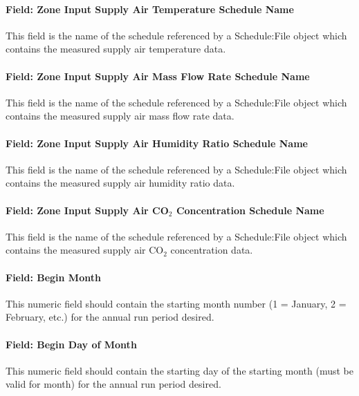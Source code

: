 \documentclass[11pt]{article}
\begin{document}
\paragraph{Field: Zone Input Supply Air Temperature Schedule Name}\label{field-zone-input-supply-air-temperature-schedule-name-hm}
This field is the name of the schedule referenced by a Schedule:File object which contains the measured supply air temperature data.

\paragraph{Field: Zone Input Supply Air Mass Flow Rate Schedule Name}\label{field-zone-input-supply-air-mass-flow-rate-schedule-name-hm}
This field is the name of the schedule referenced by a Schedule:File object which contains the measured supply air mass flow rate data.

\paragraph{Field: Zone Input Supply Air Humidity Ratio Schedule Name}\label{field-zone-input-supply-air-humidity-ratio-schedule-name-hm}
This field is the name of the schedule referenced by a Schedule:File object which contains the measured supply air humidity ratio data.

\paragraph{Field: Zone Input Supply Air CO$_2$ Concentration Schedule Name}\label{field-zone-input-supply-air-co2-concentration-schedule-name-hm}
This field is the name of the schedule referenced by a Schedule:File object which contains the measured supply air CO$_2$ concentration data.

\paragraph{Field: Begin Month}\label{field-begin-month-hm}
This numeric field should contain the starting month number (1 = January, 2 = February, etc.) for the annual run period desired.

\paragraph{Field: Begin Day of Month}\label{field-begin-day-of-month-hm}
This numeric field should contain the starting day of the starting month (must be valid for month) for the annual run period desired.
\end{document}
